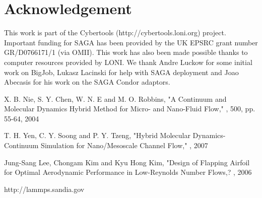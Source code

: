 \documentclass[times, 10pt,twocolumn]{article}
\begin{document}
\section*{Acknowledgement}
This work is part of the Cybertools (http://cybertools.loni.org) project. Important funding for SAGA has been provided by the UK EPSRC grant number GR/D0766171/1 (via OMII).  This work has also been made possible thanks to computer resources provided by LONI.  We thank Andre Luckow for some initial work on BigJob, Lukasz Lacinski for help with SAGA deployment and Joao Abecasis for his work on the SAGA Condor adaptors.

\nocite{ex1,ex2}



\begin{thebibliography}{99}

X. B. Nie, S. Y. Chen, W. N. E and M. O. Robbins,
\newblock "A Continuum and Molecular Dynamics Hybrid Method for Micro- and Nano-Fluid Flow,"
, 500, pp. 55-64, 2004

T. H. Yen, C. Y. Soong and P. Y. Tzeng,
\newblock "Hybrid Molecular Dynamics-Continuum Simulation for Nano/Mesoscale Channel Flow,"
, 2007

Jung-Sang Lee, Chongam Kim and Kyu Hong Kim, 
\newblock "Design of Flapping Airfoil for Optimal Aerodynamic Performance in Low-Reynolds Number Flows,?
, 2006

\newblock http://lammps.sandia.gov


\end{thebibliography}
\end{document}
